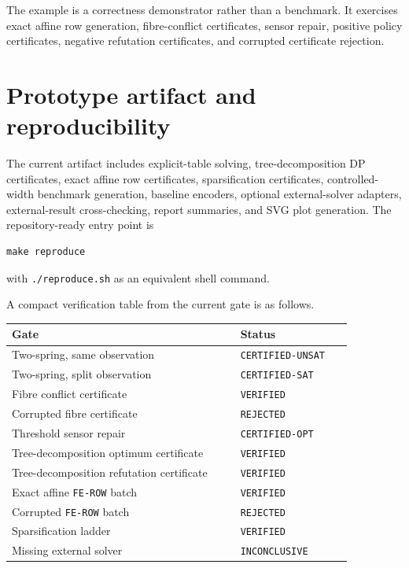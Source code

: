 \documentclass[11pt]{article}
\theoremstyle{plain}
\theoremstyle{definition}
\theoremstyle{remark}
\begin{document}
The example is a correctness demonstrator rather than a benchmark.  It exercises
exact affine row generation, fibre-conflict certificates, sensor repair,
positive policy certificates, negative refutation certificates, and corrupted
certificate rejection.

\section{Prototype artifact and reproducibility}
\label{sec:artifact}

The current artifact includes explicit-table solving, tree-decomposition DP
certificates, exact affine row certificates, sparsification certificates,
controlled-width benchmark generation, baseline encoders, optional
external-solver adapters, external-result cross-checking, report summaries, and
SVG plot generation.  The repository-ready entry point is
\begin{verbatim}
make reproduce
\end{verbatim}
with \texttt{./reproduce.sh} as an equivalent shell command.

A compact verification table from the current gate is as follows.
\begin{center}
\begin{tabular}{@{}p{0.58\linewidth}p{0.28\linewidth}@{}}
\toprule
Gate & Status\\
\midrule
Two-spring, same observation & \texttt{CERTIFIED-UNSAT}\\
Two-spring, split observation & \texttt{CERTIFIED-SAT}\\
Fibre conflict certificate & \texttt{VERIFIED}\\
Corrupted fibre certificate & \texttt{REJECTED}\\
Threshold sensor repair & \texttt{CERTIFIED-OPT}\\
Tree-decomposition optimum certificate & \texttt{VERIFIED}\\
Tree-decomposition refutation certificate & \texttt{VERIFIED}\\
Exact affine \texttt{FE-ROW} batch & \texttt{VERIFIED}\\
Corrupted \texttt{FE-ROW} batch & \texttt{REJECTED}\\
Sparsification ladder & \texttt{VERIFIED}\\
Missing external solver & \texttt{INCONCLUSIVE}\\
\bottomrule
\end{tabular}
\end{center}
\end{document}
